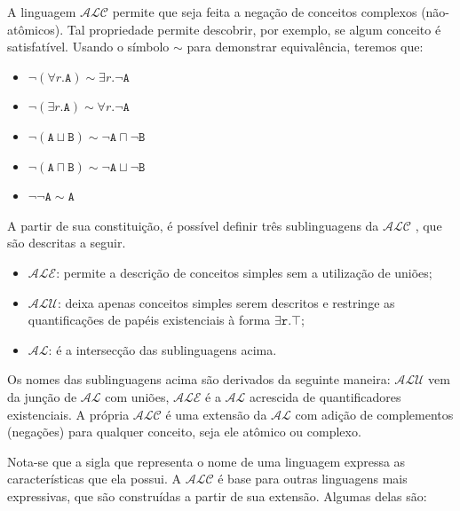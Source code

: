 A linguagem $\mathcal{ALC}$ permite que seja feita a negação de conceitos complexos (não-atômicos). Tal propriedade permite descobrir, por exemplo, se algum conceito é satisfatível. Usando o símbolo $ \sim $ para demonstrar equivalência, teremos que:

\begin{itemize}
	\item $ \neg(\forall r.\texttt{A}) \sim \exists r.\neg \texttt{A}$ 
	\item $ \neg(\exists r.\texttt{A}) \sim \forall r.\neg \texttt{A}$ 
	\item $ \neg(\texttt{A} \sqcup \texttt{B}) \sim \neg \texttt{A} \sqcap \neg \texttt{B}$ 
	\item $ \neg(\texttt{A} \sqcap \texttt{B}) \sim \neg \texttt{A} \sqcup \neg \texttt{B}$ 
	\item $ \neg \neg \texttt{A} \sim \texttt{A} $
\end{itemize}

A partir de sua constituição, é possível definir três sublinguagens da $\mathcal{ALC}$ \cite{logicaSchmidt}, que são descritas a seguir.

\begin{itemize}
	\item $\mathcal{ALE}$: permite a descrição de conceitos simples sem a utilização de uniões; 
	\item $\mathcal{ALU}$: deixa apenas conceitos simples serem descritos e restringe as quantificações de papéis existenciais à forma $ \exists\texttt{r}.\top $;
	\item $\mathcal{AL}$: é a intersecção das sublinguagens acima.
\end{itemize}

Os nomes das sublinguagens acima são derivados da seguinte maneira: $ \mathcal{ALU} $ vem da junção de $ \mathcal{AL} $ com uniões, $ \mathcal{ALE} $ é a $ \mathcal{AL} $ acrescida de quantificadores existenciais. A própria $ \mathcal{ALC} $ é uma extensão da $ \mathcal{AL} $ com adição de complementos (negações) para qualquer conceito, seja ele atômico ou complexo. 

Nota-se que a sigla que representa o nome de uma linguagem expressa as características que ela possui.
A $ \mathcal{ALC} $ é base para outras linguagens mais expressivas, que são construídas a partir de sua extensão. Algumas delas são:

